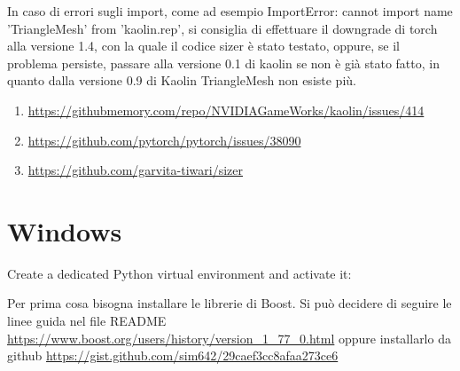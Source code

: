 \medskip





\medskip

In caso di errori sugli import, come ad esempio ImportError: cannot import name 'TriangleMesh' from 'kaolin.rep', si consiglia di effettuare il downgrade di torch alla versione 1.4, con la quale il codice sizer è stato testato, oppure, se il problema persiste, passare alla versione 0.1 di kaolin se non è già stato fatto, in quanto dalla versione 0.9 di Kaolin TriangleMesh non esiste più.

\medskip




\begin{enumerate}
\item \url{https://githubmemory.com/repo/NVIDIAGameWorks/kaolin/issues/414} 
\item \url{https://github.com/pytorch/pytorch/issues/38090}
\item \url{https://github.com/garvita-tiwari/sizer}
\end{enumerate}




\newpage

\section{Windows}

\medskip

Create a dedicated Python virtual environment and activate it:

\medskip


\medskip




\medskip

Per prima cosa bisogna installare le librerie di Boost.
Si può decidere di seguire le linee guida nel file README \url{https://www.boost.org/users/history/version_1_77_0.html} oppure installarlo da github \url{https://gist.github.com/sim642/29caef3cc8afaa273ce6}

